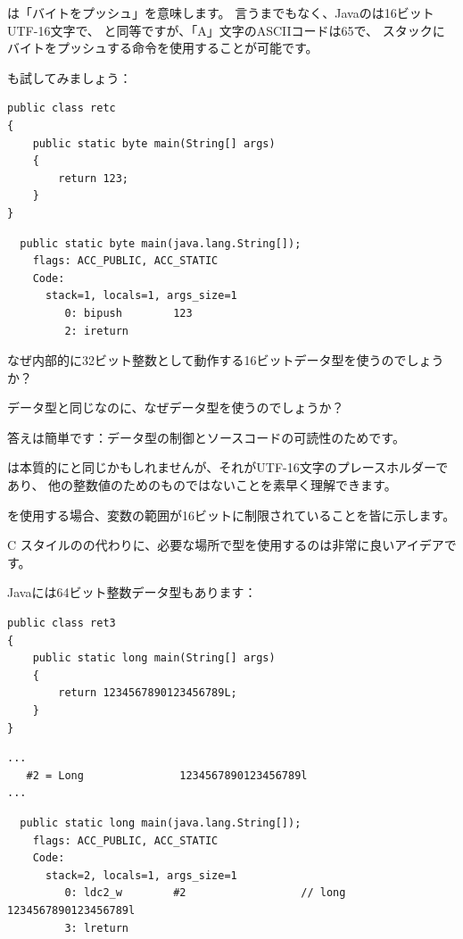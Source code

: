 は「バイトをプッシュ」を意味します。
言うまでもなく、Javaのは16ビットUTF-16文字で、
と同等ですが、「A」文字のASCIIコードは65で、
スタックにバイトをプッシュする命令を使用することが可能です。

も試してみましょう：

\begin{lstlisting}[style=customjava]
public class retc
{
	public static byte main(String[] args) 
	{
		return 123;
	}
}
\end{lstlisting}

\begin{lstlisting}
  public static byte main(java.lang.String[]);
    flags: ACC_PUBLIC, ACC_STATIC
    Code:
      stack=1, locals=1, args_size=1
         0: bipush        123
         2: ireturn       
\end{lstlisting}

なぜ内部的に32ビット整数として動作する16ビットデータ型を使うのでしょうか？

データ型と同じなのに、なぜデータ型を使うのでしょうか？

答えは簡単です：データ型の制御とソースコードの可読性のためです。

は本質的にと同じかもしれませんが、それがUTF-16文字のプレースホルダーであり、
他の整数値のためのものではないことを素早く理解できます。

を使用する場合、変数の範囲が16ビットに制限されていることを皆に示します。

C スタイルのの代わりに、必要な場所で型を使用するのは非常に良いアイデアです。

Javaには64ビット整数データ型もあります：

\begin{lstlisting}[style=customjava]
public class ret3
{
	public static long main(String[] args)
	{
		return 1234567890123456789L;
	}
}
\end{lstlisting}

\begin{lstlisting}[caption=定数プール]
...
   #2 = Long               1234567890123456789l
...
\end{lstlisting}

\begin{lstlisting}
  public static long main(java.lang.String[]);
    flags: ACC_PUBLIC, ACC_STATIC
    Code:
      stack=2, locals=1, args_size=1
         0: ldc2_w        #2                  // long 1234567890123456789l
         3: lreturn       
\end{lstlisting}

